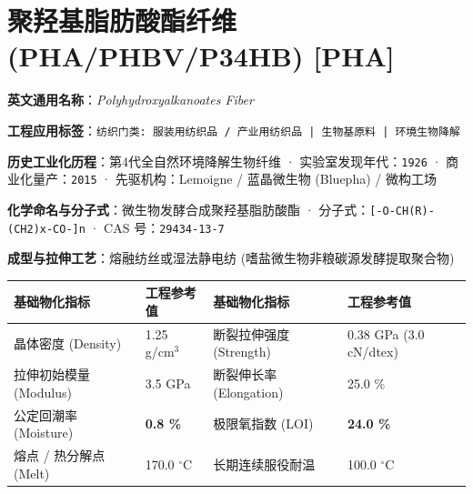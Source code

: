 \documentclass[11pt,openright,twoside,UTF8]{ctexbook}
\begin{document}
\section{聚羟基脂肪酸酯纤维 (PHA/PHBV/P34HB) [PHA]}
\label{sec:pha}

\noindent\textbf{英文通用名称}：\textit{Polyhydroxyalkanoates Fiber}\par
\noindent\textbf{工程应用标签}：\texttt{纺织门类: 服装用纺织品 / 产业用纺织品 | 生物基原料 | 环境生物降解}\par
\noindent\textbf{历史工业化历程}：第4代全自然环境降解生物纤维 · 实验室发现年代：\texttt{1926} · 商业化量产：\texttt{2015} · 先驱机构：Lemoigne / 蓝晶微生物 (Bluepha) / 微构工场\par
\noindent\textbf{化学命名与分子式}：微生物发酵合成聚羟基脂肪酸酯 · 分子式：\texttt{[-O-CH(R)-(CH2)x-CO-]n} · CAS 号：\texttt{29434-13-7}\par
\noindent\textbf{成型与拉伸工艺}：熔融纺丝或湿法静电纺 (嗜盐微生物非粮碳源发酵提取聚合物)\par

\vspace{0.15cm}
\begin{center}
\small
\begin{tabularx}{\textwidth}{p{3.8cm}Xp{3.8cm}X}
\toprule
\textbf{基础物化指标} & \textbf{工程参考值} & \textbf{基础物化指标} & \textbf{工程参考值} \\
\midrule
晶体密度 (Density) & 1.25 g/cm$^3$ & 断裂拉伸强度 (Strength) & 0.38 GPa (3.0 cN/dtex) \\
拉伸初始模量 (Modulus) & 3.5 GPa & 断裂伸长率 (Elongation) & 25.0 \% \\
公定回潮率 (Moisture) & \textbf{0.8 \%} & 极限氧指数 (LOI) & \textbf{24.0 \%} \\
熔点 / 热分解点 (Melt) & 170.0 $^\circ\mathrm{C}$ & 长期连续服役耐温 & 100.0 $^\circ\mathrm{C}$ \\
\bottomrule
\end{tabularx}
\end{center}
\vspace{0.15cm}
\end{document}
